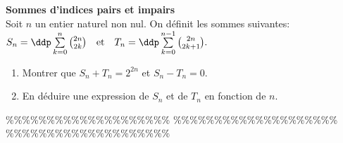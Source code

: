 



\begin{exercice}   \; \textbf{Sommes d'indices pairs et impairs}\\
\noindent Soit $n$ un entier naturel non nul. On d\'efinit les sommes suivantes: $S_n=\ddp \sum\limits_{k=0}^{n} \binom{2n}{2k}\quad \hbox{et}\quad T_n=\ddp \sum\limits_{k=0}^{n-1} \binom{2n}{2k+1}.$
\begin{enumerate}
\item Montrer que $S_n+T_n=2^{2n}$ et $S_n-T_n=0$.
\item En d\'eduire une expression de $S_n$ et de $T_n$ en fonction de $n$.
\end{enumerate} 
\end{exercice}


\%\%\%\%\%\%\%\%\%\%\%\%\%\%\%\%\%\%\%\%
\%\%\%\%\%\%\%\%\%\%\%\%\%\%\%\%\%\%\%\%
\%\%\%\%\%\%\%\%\%\%\%\%\%\%\%\%\%\%\%\%




